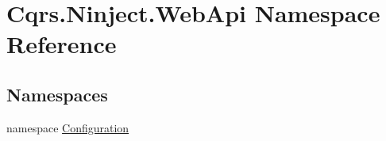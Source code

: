 \hypertarget{namespaceCqrs_1_1Ninject_1_1WebApi}{}\section{Cqrs.\+Ninject.\+Web\+Api Namespace Reference}
\label{namespaceCqrs_1_1Ninject_1_1WebApi}
\subsection*{Namespaces}
\begin{DoxyCompactItemize}
\item 
namespace \hyperlink{namespaceCqrs_1_1Ninject_1_1WebApi_1_1Configuration}{Configuration}
\end{DoxyCompactItemize}
